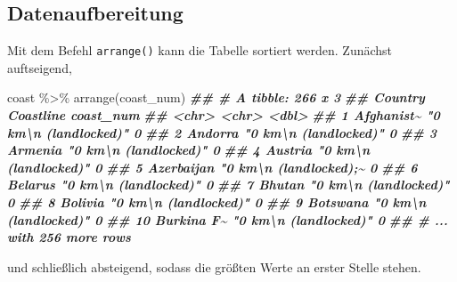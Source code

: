 \documentclass[11pt,german,a4paper]{article}
\newenvironment{Shaded}{\begin{snugshade}}{\end{snugshade}}
\newcommand{\DocumentationTok}[1]{\textcolor[rgb]{0.56,0.35,0.01}{\textbf{\textit{#1}}}}
\newcommand{\FunctionTok}[1]{\textcolor[rgb]{0.00,0.00,0.00}{#1}}
\newcommand{\NormalTok}[1]{#1}
\newcommand{\SpecialCharTok}[1]{\textcolor[rgb]{0.00,0.00,0.00}{#1}}
\begin{document}
\hypertarget{datenaufbereitung}{%
\subsection{Datenaufbereitung}\label{datenaufbereitung}}

Mit dem Befehl \texttt{arrange()} kann die Tabelle sortiert werden. Zunächst auftseigend,

\begin{Shaded}
\begin{Highlighting}[]
\NormalTok{coast }\SpecialCharTok{\%\textgreater{}\%}
  \FunctionTok{arrange}\NormalTok{(coast\_num)}
\DocumentationTok{\#\# \# A tibble: 266 x 3}
\DocumentationTok{\#\#    Country    Coastline                       coast\_num}
\DocumentationTok{\#\#    \textless{}chr\textgreater{}      \textless{}chr\textgreater{}                               \textless{}dbl\textgreater{}}
\DocumentationTok{\#\#  1 Afghanist\textasciitilde{} "0 km\textbackslash{}n          (landlocked)"          0}
\DocumentationTok{\#\#  2 Andorra    "0 km\textbackslash{}n          (landlocked)"          0}
\DocumentationTok{\#\#  3 Armenia    "0 km\textbackslash{}n          (landlocked)"          0}
\DocumentationTok{\#\#  4 Austria    "0 km\textbackslash{}n          (landlocked)"          0}
\DocumentationTok{\#\#  5 Azerbaijan "0 km\textbackslash{}n          (landlocked);\textasciitilde{}         0}
\DocumentationTok{\#\#  6 Belarus    "0 km\textbackslash{}n          (landlocked)"          0}
\DocumentationTok{\#\#  7 Bhutan     "0 km\textbackslash{}n          (landlocked)"          0}
\DocumentationTok{\#\#  8 Bolivia    "0 km\textbackslash{}n          (landlocked)"          0}
\DocumentationTok{\#\#  9 Botswana   "0 km\textbackslash{}n          (landlocked)"          0}
\DocumentationTok{\#\# 10 Burkina F\textasciitilde{} "0 km\textbackslash{}n          (landlocked)"          0}
\DocumentationTok{\#\# \# ... with 256 more rows}
\end{Highlighting}
\end{Shaded}

und schließlich absteigend, sodass die größten Werte an erster Stelle stehen.
\end{document}

